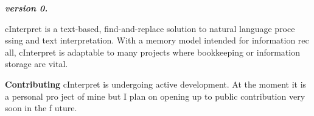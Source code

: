 {\itshape {\bfseries{version 0.}}}

c\+Interpret is a text-\/based, find-\/and-\/replace solution to natural language proce ssing and text interpretation. With a memory model intended for information rec all, c\+Interpret is adaptable to many projects where bookkeeping or information storage are vital.

{\bfseries{Contributing}} c\+Interpret is undergoing active development. At the moment it is a personal pro ject of mine but I plan on opening up to public contribution very soon in the f uture. 